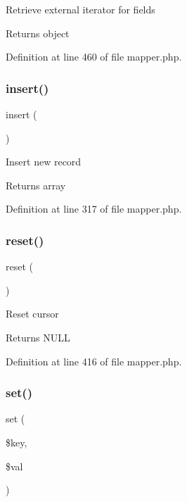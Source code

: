 Retrieve external iterator for fields \begin{DoxyReturn}{Returns}
object 
\end{DoxyReturn}


Definition at line 460 of file mapper.\+php.

\hypertarget{class_d_b_1_1_jig_1_1_mapper_a473241246338cfccc4709ba896749019}{}\label{class_d_b_1_1_jig_1_1_mapper_a473241246338cfccc4709ba896749019} 
\subsubsection{\texorpdfstring{insert()}{insert()}}
{\footnotesize\ttfamily insert (\begin{DoxyParamCaption}{ }\end{DoxyParamCaption})}

Insert new record \begin{DoxyReturn}{Returns}
array 
\end{DoxyReturn}


Definition at line 317 of file mapper.\+php.

\hypertarget{class_d_b_1_1_jig_1_1_mapper_a4a20559544fdf4dcb457e258dc976cf8}{}\label{class_d_b_1_1_jig_1_1_mapper_a4a20559544fdf4dcb457e258dc976cf8} 
\subsubsection{\texorpdfstring{reset()}{reset()}}
{\footnotesize\ttfamily reset (\begin{DoxyParamCaption}{ }\end{DoxyParamCaption})}

Reset cursor \begin{DoxyReturn}{Returns}
N\+U\+LL 
\end{DoxyReturn}


Definition at line 416 of file mapper.\+php.

\hypertarget{class_d_b_1_1_jig_1_1_mapper_ac8d8012023e560c81f55a629022cb65a}{}\label{class_d_b_1_1_jig_1_1_mapper_ac8d8012023e560c81f55a629022cb65a} 
\subsubsection{\texorpdfstring{set()}{set()}}
{\footnotesize\ttfamily set (\begin{DoxyParamCaption}\item[{}]{\$key,  }\item[{}]{\$val }\end{DoxyParamCaption})}

